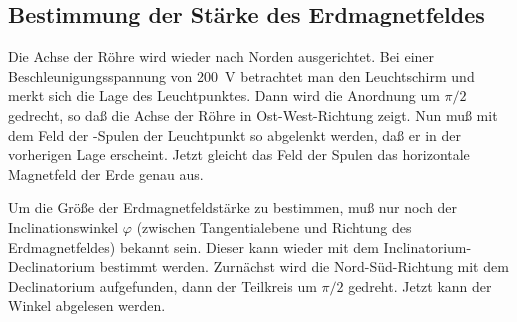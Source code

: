 \subsection{Bestimmung der Stärke des Erdmagnetfeldes}

Die Achse der Röhre wird wieder nach Norden ausgerichtet. Bei einer
Beschleunigungsspannung von \SI{200}{\volt} betrachtet man den
Leuchtschirm und merkt sich die Lage des Leuchtpunktes. Dann wird die
Anordnung um $\pi/2$ gedrecht, so daß die Achse der Röhre in
Ost-West-Richtung zeigt. Nun muß mit dem Feld der
-Spulen der Leuchtpunkt so abgelenkt werden, daß er in
der vorherigen Lage erscheint. Jetzt gleicht das Feld der Spulen das
horizontale Magnetfeld der Erde genau aus.

Um die Größe der Erdmagnetfeldstärke zu bestimmen, muß nur noch der
Inclinationswinkel $\varphi$ (zwischen Tangentialebene und Richtung des
Erdmagnetfeldes) bekannt sein. Dieser kann wieder mit dem
Inclinatorium-Declinatorium bestimmt werden. Zurnächst wird die
Nord-Süd-Richtung mit dem Declinatorium aufgefunden, dann der Teilkreis
um $\pi/2$ gedreht. Jetzt kann der Winkel abgelesen werden.
